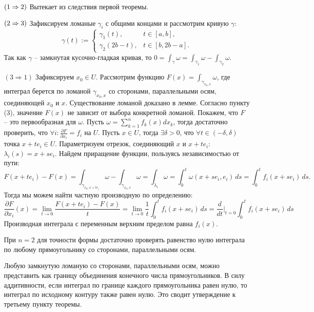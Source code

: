 \begin{myproof}
	$(1 \Rightarrow 2)$ Вытекает из следствия первой теоремы. 

	\vspace{5pt}
	$(2 \Rightarrow 3)$ Зафиксируем ломаные $\gamma_i$ с общими концами и рассмотрим кривую $\gamma$: 
	\[ \gamma(t) := \begin{cases}
	 \gamma_1(t), & t\in [a, b],   \\  
	 \gamma_2(2b - t),  & t\in [b, 2b-a].  
	\end{cases} \] Так как $\gamma$ -- замкнутая кусочно-гладкая кривая, то $0 = \int_{\gamma} \omega = \int_{\gamma_1} \omega - \int_{\gamma_2} \omega$.

	\vspace{5pt}
	$(3 \Rightarrow 1)$ Зафиксируем $x_0 \in U$. Рассмотрим функцию $F(x) = \int_{\gamma_{x_0, x}} \omega$, где интеграл берется по ломаной $\gamma_{x_0, x}$ со сторонами, параллельными осям, соединяющей $x_0$ и $x$. Существование ломаной доказано в лемме. 
	Согласно пункту (3), значение $F(x)$ не зависит от выбора конкретной ломаной. 
	Покажем, что $F$ -- это первообразная для $\omega$. Пусть $\omega = \sum_{k=1}^{n} f_k(x) dx_k$, тогда достаточно проверить, что $\forall i : \frac{\partial F}{\partial x_i} = f_i$ на $U$.
	Пусть $x \in U$, тогда $\exists \delta > 0$, что $\forall t \in (-\delta, \delta)$ точка $x + t e_i \in U$.
	Параметризуем отрезок, соединяющий $x$ и $x + t e_i$: $\lambda_i(s) = x + s e_i$.
	Найдем приращение функции, пользуясь независимостью от пути:
	\[ F(x + t e_i) - F(x) = \int_{\gamma_{x_0, x+te_i}} \omega - \int_{\gamma_{x_0, x}} \omega = \int_{\lambda_i} \omega = \int_0^t \omega(x+se_i, e_i) \, ds = \int_0^t f_i(x + se_i) \, ds. \]
	Тогда мы можем найти частную производную по определению:
	\[ \frac{\partial F}{\partial x_i}(x) = \lim \limits_{t \to 0} \frac{F(x + t e_i) - F(x)}{t} = \lim \limits_{t \to 0} \frac{1}{t} \int_0^t f_i(x + se_i) \, ds = \frac{d}{dt} \Big|_{t = 0} \int_0^t f_i(x + se_i) \, ds \]
	Производная интеграла с переменным верхним пределом равна $f_i(x)$.
 \end{myproof}

 \begin{corollary}
	При $n=2$ для точности формы достаточно проверять равенство нулю интеграла по любому прямоугольнику со сторонами, параллельными осям. 
 \end{corollary}

\begin{myproof}
	Любую замкнутую ломаную со сторонами, параллельными осям, можно представить как границу объединения конечного числа прямоугольников. 
	В силу аддитивности, если интеграл по границе каждого прямоугольника равен нулю, то интеграл по исходному контуру также равен нулю. 
	Это сводит утверждение к третьему пункту теоремы.
\end{myproof}
